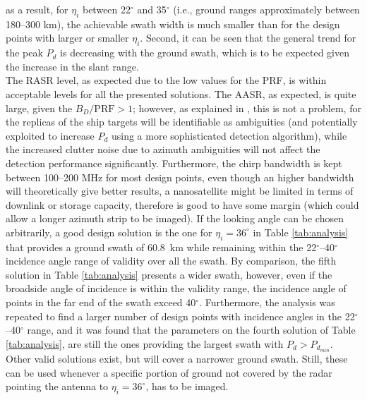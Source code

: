 \documentclass[conference,a4paper]{IEEEtran}
\begin{document}
    as a result, for $\eta_i$ between 22$^\circ$ and 35$^\circ$ (i.e., ground ranges approximately between 180--300 km), the achievable swath width is much smaller than for the design points with larger or smaller $\eta_i$.
    Second, it can be seen that the general trend for the peak $P_d$ is decreasing with the ground swath, which is to be expected given the increase in the slant range.\\
    The RASR level, as expected due to the low values for the PRF, is within acceptable levels for all the presented solutions.
    The AASR, as expected, is quite large, given the $B_D/\text{PRF}>1$; however, as explained in \cite{DLRjournal}, this is not a problem, for the replicas of the ship targets will be identifiable as ambiguities (and potentially exploited to increase $P_d$ using a more sophisticated detection algorithm), while the increased clutter noise due to azimuth ambiguities will not affect the detection performance significantly.
    Furthermore, the chirp bandwidth is kept between 100--200 MHz for most design points, even though an higher bandwidth will theoretically give better results, a nanosatellite might be limited in terms of downlink or storage capacity, therefore is good to have some margin (which could allow a longer azimuth strip to be imaged).
    If the looking angle can be chosen arbitrarily, a good design solution is the one for $\eta_i=36^\circ$ in Table \ref{tab:analysis} that provides a ground swath of 60.8~km while remaining within the 22$^\circ$--40$^\circ$ incidence angle range of validity over all the swath.
    By comparison, the fifth solution in Table \ref{tab:analysis} presents a wider swath, however, even if the broadside angle of incidence is within the validity range, the incidence angle of points in the far end of the swath exceed 40$^\circ$.
    Furthermore, the analysis was repeated to find a larger number of design points with incidence angles in the 22$^\circ$--40$^\circ$ range, and it was found that the parameters on the fourth solution of Table \ref{tab:analysis}, are still the ones providing the largest swath with $P_d>P_{d_{min}}$.
    Other valid solutions exist, but will cover a narrower ground swath.
    Still, these can be used whenever a specific portion of ground not covered by the radar pointing the antenna to $\eta_i=36^\circ$, has to be imaged.
\end{document}
